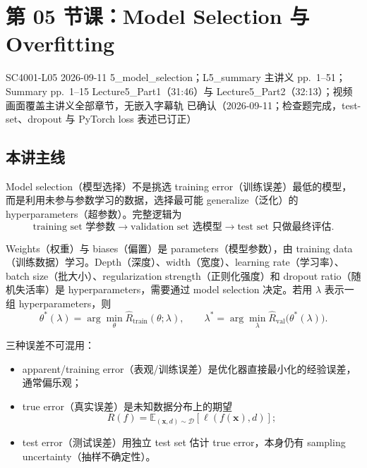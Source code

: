 
\section{第 05 节课：Model Selection 与 Overfitting}
\label{lecture:SC4001-L05}

\lecturemeta
  {SC4001-L05}
  {2026-09-11}
  {5\_model\_selection；L5\_summary}
  {主讲义 pp.~1--51；Summary pp.~1--15}
  {Lecture5\_Part1（31:46）与 Lecture5\_Part2（32:13）；视频画面覆盖主讲义全部章节，无嵌入字幕轨}
  {已确认（2026-09-11；检查题完成，test-set、dropout 与 PyTorch loss 表述已订正）}

\subsection{本讲主线}

Model selection（模型选择）不是挑选 training error（训练误差）最低的模型，而是利用未参与参数学习的数据，选择最可能 generalize（泛化）的 hyperparameters（超参数）。完整逻辑为
\[
  \boxed{\text{training set 学参数}}
  \longrightarrow
  \boxed{\text{validation set 选模型}}
  \longrightarrow
  \boxed{\text{test set 只做最终评估}}.
\]


Weights（权重）与 biases（偏置）是 parameters（模型参数），由 training data（训练数据）学习。Depth（深度）、width（宽度）、learning rate（学习率）、batch size（批大小）、regularization strength（正则化强度）和 dropout ratio（随机失活率）是 hyperparameters，需要通过 model selection 决定。若用 $\lambda$ 表示一组 hyperparameters，则
\[
  \theta^*(\lambda)
  =\arg\min_\theta \widehat R_{\mathrm{train}}(\theta;\lambda),
  \qquad
  \lambda^*
  =\arg\min_\lambda
    \widehat R_{\mathrm{val}}\bigl(\theta^*(\lambda)\bigr).
\]

三种误差不可混用：
\begin{itemize}
  \item apparent/training error（表观/训练误差）是优化器直接最小化的经验误差，通常偏乐观；
  \item true error（真实误差）是未知数据分布上的期望
    \[
      R(f)=\mathbb E_{(\bm x,d)\sim\mathcal D}
      [\ell(f(\bm x),d)];
    \]
  \item test error（测试误差）用独立 test set 估计 true error，本身仍有 sampling uncertainty（抽样不确定性）。
\end{itemize}

